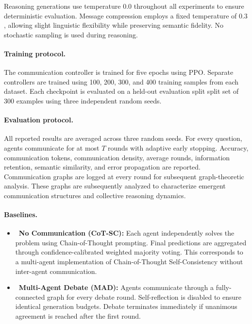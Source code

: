 \documentclass[11pt]{article}
\begin{document}
Reasoning generations use temperature $0.0$ throughout all experiments to
ensure deterministic evaluation.
Message compression employs a fixed temperature of $0.3$, allowing slight
linguistic flexibility while preserving semantic fidelity.
No stochastic sampling is used during reasoning.

\paragraph{Training protocol.}

The communication controller is trained for five epochs using PPO.
Separate controllers are trained using
100,
200,
300,
and
400
training samples from each dataset.
Each checkpoint is evaluated on a held-out evaluation split split set of 300 examples using three
independent random seeds.

\paragraph{Evaluation protocol.}

All reported results are averaged across three random seeds.
For every question, agents communicate for at most $T$ rounds with adaptive
early stopping.
Accuracy, communication tokens, communication density, average rounds,
information retention, semantic similarity, and error propagation are reported.
Communication graphs are logged at every round for subsequent graph-theoretic analysis. These graphs are subsequently analyzed to characterize emergent communication
structures and collective reasoning dynamics.

\paragraph{Baselines.}


\begin{itemize}
    \item ~\textbf{No Communication (CoT-SC):}
Each agent independently solves the problem using Chain-of-Thought prompting.
Final predictions are aggregated through confidence-calibrated weighted majority
voting.
This corresponds to a multi-agent implementation of Chain-of-Thought
Self-Consistency without inter-agent communication.
\item~\textbf{Multi-Agent Debate (MAD):}
Agents communicate through a fully-connected graph for every debate round.
Self-reflection is disabled to ensure identical generation budgets.
Debate terminates immediately if unanimous agreement is reached after the first
round.
\end{itemize}
\end{document}
